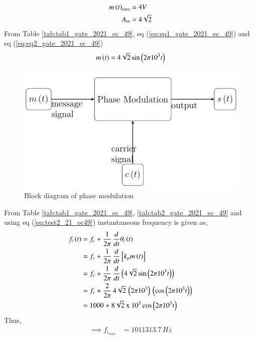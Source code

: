\documentclass[journal,12pt,twocolumn]{IEEEtran}
\begin{document}
\begin{align}
    m\left(t\right)_{rms} &= 4V \label{eq:eq1_gate_2021_ec_49} \\
    A_m &= 4\sqrt{2} \label{eq:eq2_gate_2021_ec_49}
\end{align}
From Table \ref{tab:tab1_gate_2021_ec_49}, eq (\ref{eq:eq1_gate_2021_ec_49}) and eq (\ref{eq:eq2_gate_2021_ec_49})
\begin{align}
     m\left(t\right) &= 4\sqrt{2}\sin \left(2 \pi 10^3 t\right)\\
\end{align}

\begin{figure}[ht]
    \centering
    \includegraphics[width=\columnwidth]{2021/EC/49/figs/fig2.png}
    \caption{Block diagram of phase modulation}
    \label{fig:fig1_gate_2021_ec_49}  
\end{figure}
From Table \ref{tab:tab1_gate_2021_ec_49}, \ref{tab:tab2_gate_2021_ec_49} and using eq (\ref{eq:test2_21_ec49}) instantaneous frequency is given as,
\begin{align}
    f_i\left(t\right) &= f_c + \frac{1}{2\pi}\, \frac{d}{dt}\theta_i\left(t\right)\\
    &= f_c + \frac{1}{2\pi}\, \frac{d}{dt}{}\left[k_p m\left(t\right)\right]\\
    &= f_c + \frac{1}{2\pi}\, \frac{d}{dt}\left(4\sqrt{2}\sin \left(2 \pi 10^3 t\right)\right)\\
    &= f_c + \frac{2}{2\pi}\, 4\sqrt{2}\, \left(2\pi 10^3\right)\, \left(\cos \left(2 \pi 10^3 t\right)\right)\\
    &= 1000 + 8\sqrt{2} \text{ x } 10^3 \cos \left(2\pi 10^3 t\right)
\end{align}
Thus,
\begin{align}
    \implies f_{i_{max}} &= 1011313.7 \, Hz
\end{align}
\end{document}
